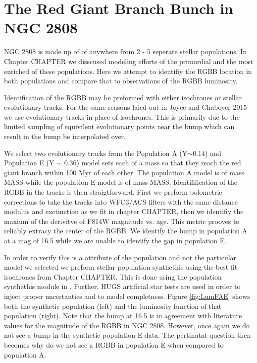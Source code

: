 \section{The Red Giant Branch Bunch in NGC 2808}
NGC 2808 is made up of of anywhere from 2 - 5 seperate stellar populations. In
Chapter {\color{red} CHAPTER} we disscused modeling efforts of the primordial
and the most enriched of these populations. Here we attempt to identifiy the
RGBB location in both populations and compare that to observations of the RGBB
luminosity.

Identification of the RGBB may be preformed with either isochrones or stellar
evolutionary tracks. For the same reasons laied out in {\color{red} Joyce and
Chaboyer 2015} we use evolutionary tracks in place of isochrones. This is
primarily due to the limited sampling of equivilent evolutionary points near
the bump which can result in the bump be interpolated over. 

We select two evolutionary tracks from the Population A (Y$\sim$0.14) and
Population E (Y $\sim$ 0.36) model sets each of a mass so that they reach the
red giant branch within 100 Myr of each other. The population A model is of
mass {\color{red} MASS} while the population E model is of mass {\color{red}
MASS}. Identifification of the RGBB in the tracks is then straigtforward. First
we preform bolometric corrections to take the tracks into WFC3/ACS filters with
the same distance modulus and exctinction as we fit in chapter {\color{red}
CHAPTER}, then we identifiy the maxium of the derivitve of F814W magnitude vs.
age. This metric prooves to reliably extracy the center of the RGBB. We
identify the bump in population A at a mag of {\color{red}16.5} while we are
unable to identify the gap in population E.

In order to verify this is a attribute of the population and not the particular
model we selected we preform stellar population synthethis using the best fit
isochrones from Chapter {\color{red} CHAPTER}. This is done using the
population synthethis module in \fidanka. Further, HUGS artificial star tests
are used in order to inject proper uncertanties and to model completness.
Figure \ref{fig:LumFAE} shows both the synthetic population (left) and the
luminosity function of that population (right). Note that the bump at
{\color{red}16.5} is in agreement with literature values for the magnitude of the
RGBB in NGC 2808. However, once again we do not see a bump in the synthetic
population E data. The pertinatnt question then becomes why do we not see a
RGBB in population E when compared to population A.

